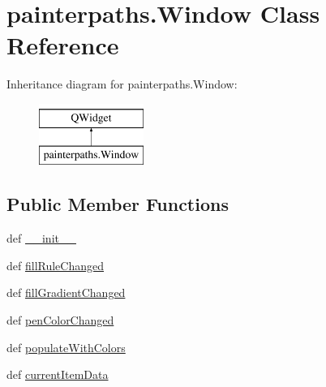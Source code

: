 \hypertarget{classpainterpaths_1_1Window}{}\section{painterpaths.\+Window Class Reference}
\label{classpainterpaths_1_1Window}
Inheritance diagram for painterpaths.\+Window\+:\begin{figure}[H]
\begin{center}
\leavevmode
\includegraphics[height=2.000000cm]{classpainterpaths_1_1Window}
\end{center}
\end{figure}
\subsection*{Public Member Functions}
\begin{DoxyCompactItemize}
\item 
def \hyperlink{classpainterpaths_1_1Window_a7c91cfac9d1e992d3b1f1a1aeba028ac}{\+\_\+\+\_\+init\+\_\+\+\_\+}
\item 
def \hyperlink{classpainterpaths_1_1Window_a46df07e4b3314b425cfd040499bdf74b}{fill\+Rule\+Changed}
\item 
def \hyperlink{classpainterpaths_1_1Window_a446b782ef6557afe42bfe8c0b967e82b}{fill\+Gradient\+Changed}
\item 
def \hyperlink{classpainterpaths_1_1Window_a09ec2fabf8b177f55696bf9ec4e58b32}{pen\+Color\+Changed}
\item 
def \hyperlink{classpainterpaths_1_1Window_a9fafdf39f000fa4d7a70b0034a51d1e0}{populate\+With\+Colors}
\item 
def \hyperlink{classpainterpaths_1_1Window_a5cfc37fee8274e079caeea20936f5474}{current\+Item\+Data}
\end{DoxyCompactItemize}
